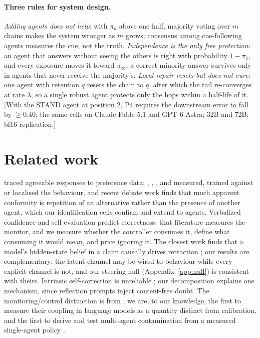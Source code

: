 \documentclass{article}
\newcommand{\pending}[1]{\textcolor{blue!70!black}{[#1]}}
\newcommand{\piinf}{\pi_{\infty}}
\begin{document}
\paragraph{Three rules for system design.} \emph{Adding agents does not help}: with $\pi_k$ above one half, majority voting over $m$ chains makes the system wronger as $m$ grows; consensus among cue-following agents measures the cue, not the truth. \emph{Independence is the only free protection}: an agent that answers without seeing the others is right with probability $1-\pi_1$, and every exposure moves it toward $\piinf$; a correct minority answer survives only in agents that never receive the majority's. \emph{Local repair resets but does not cure}: one agent with retention $q$ resets the chain to $q$, after which the tail re-converges at rate $\lambda$, so a single robust agent protects only the hops within a half-life of it. \pending{With the STAND agent at position 2, P4 requires the downstream error to fall by $\ge0.40$; the same cells on Claude Fable 5.1 and GPT-6 Astra; 32B and 72B; bf16 replication.}

\section{Related work}
\citet{sharma2023sycophancy} traced agreeable responses to preference data; \citet{perez2022discovering}, \citet{laban2023flipflop}, \citet{stengeleskin2025pbt}, \citet{zhang2025pressuretune} and \citet{chen2024pinpoint} measured, trained against or localised the behaviour, and recent debate work finds that much apparent conformity is repetition of an alternative rather than the presence of another agent, which our identification cells confirm and extend to agents. Verbalized confidence \citep{lin2022truthfulqa,kadavath2022language} and self-evaluation predict correctness; that literature measures the monitor, and we measure whether the controller consumes it, define what consuming it would mean, and price ignoring it. The closest work finds that a model's hidden-state belief in a claim causally drives retraction \citep{aamir2026steering}; our results are complementary: the latent channel may be wired to behaviour while every explicit channel is not, and our steering null (Appendix~\ref{app:null}) is consistent with theirs. Intrinsic self-correction is unreliable \citep{huang2024selfcorrect}; our decomposition explains one mechanism, since reflection prompts inject content-free doubt. The monitoring/control distinction is from \citet{nelson1990metamemory}; we are, to our knowledge, the first to measure their coupling in language models as a quantity distinct from calibration, and the first to derive and test multi-agent contamination from a measured single-agent policy \citep{mytsyk2026bts}.
\end{document}
